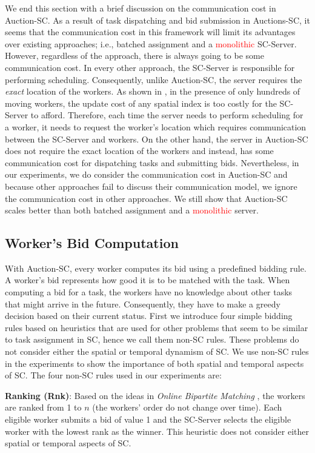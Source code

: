We end this section with a brief discussion on the communication cost in Auction-SC. As a result of task dispatching and bid submission in Auctions-SC, it seems that the communication cost in this framework will limit its advantages over existing approaches; i.e., batched assignment and a \textcolor{red}{monolithic} SC-Server. However, regardless of the approach, there is always going to be some communication cost. In every other approach, the SC-Server is responsible for performing scheduling. Consequently, unlike Auction-SC, the server requires the \textit{exact} location of the workers. As shown in \cite{Akdogan14}, in the presence of only hundreds of moving workers, the update cost of any spatial index is too costly for the SC-Server to afford. Therefore, each time the server needs to perform scheduling for a worker, it needs to request the worker's location which requires communication between the SC-Server and workers. On the other hand, the server in Auction-SC does not require the exact location of the workers and instead, has some communication cost for dispatching tasks and submitting bids. Nevertheless, in our experiments, we do consider the communication cost in Auction-SC and because other approaches fail to discuss their communication model, we ignore the communication cost in other approaches. We still show that Auction-SC scales better than both batched assignment and a \textcolor{red}{monolithic} server.

\subsection{Worker's Bid Computation}

With Auction-SC, every worker computes its bid using a predefined bidding rule. A worker's bid represents how good it is to be matched with the task. When computing a bid for a task, the workers have no knowledge about other tasks that might arrive in the future. Consequently, they have to make a greedy decision based on their current status. First we introduce four simple bidding rules based on heuristics that are used for other problems that seem to be similar to task assignment in SC, hence we call them non-SC rules. These problems do not consider either the spatial or temporal dynamism of SC. We use non-SC rules in the experiments to show the importance of both spatial and temporal aspects of SC. The four non-SC rules used in our experiments are:

\noindent\textbf{Ranking (Rnk)}:
Based on the ideas in \emph{Online Bipartite Matching} \cite{Karp90}, the workers are ranked from 1 to $n$ (the workers' order do not change over time). Each eligible worker submits a bid of value 1 and the SC-Server selects the eligible worker with the lowest rank as the winner. This heuristic does not consider either spatial or temporal aspects of SC.

